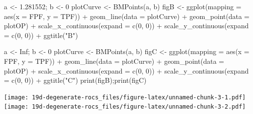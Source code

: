 \documentclass[
]{book}
\newenvironment{Shaded}{\begin{snugshade}}{\end{snugshade}}
\newcommand{\AttributeTok}[1]{\textcolor[rgb]{0.77,0.63,0.00}{#1}}
\newcommand{\ConstantTok}[1]{\textcolor[rgb]{0.00,0.00,0.00}{#1}}
\newcommand{\DecValTok}[1]{\textcolor[rgb]{0.00,0.00,0.81}{#1}}
\newcommand{\FloatTok}[1]{\textcolor[rgb]{0.00,0.00,0.81}{#1}}
\newcommand{\FunctionTok}[1]{\textcolor[rgb]{0.00,0.00,0.00}{#1}}
\newcommand{\NormalTok}[1]{#1}
\newcommand{\OtherTok}[1]{\textcolor[rgb]{0.56,0.35,0.01}{#1}}
\newcommand{\SpecialCharTok}[1]{\textcolor[rgb]{0.00,0.00,0.00}{#1}}
\newcommand{\StringTok}[1]{\textcolor[rgb]{0.31,0.60,0.02}{#1}}
\begin{document}
\begin{Shaded}
\begin{Highlighting}[]
\NormalTok{a }\OtherTok{\textless{}{-}} \FloatTok{1.281552}\NormalTok{; b }\OtherTok{\textless{}{-}} \DecValTok{0}
\NormalTok{plotCurve }\OtherTok{\textless{}{-}} \FunctionTok{BMPoints}\NormalTok{(a, b)}
\NormalTok{figB }\OtherTok{\textless{}{-}} \FunctionTok{ggplot}\NormalTok{(}\AttributeTok{mapping =} \FunctionTok{aes}\NormalTok{(}\AttributeTok{x =}\NormalTok{ FPF, }\AttributeTok{y =}\NormalTok{ TPF)) }\SpecialCharTok{+} 
  \FunctionTok{geom\_line}\NormalTok{(}\AttributeTok{data =}\NormalTok{ plotCurve) }\SpecialCharTok{+} 
  \FunctionTok{geom\_point}\NormalTok{(}\AttributeTok{data =}\NormalTok{ plotOP)  }\SpecialCharTok{+} 
  \FunctionTok{scale\_x\_continuous}\NormalTok{(}\AttributeTok{expand =} \FunctionTok{c}\NormalTok{(}\DecValTok{0}\NormalTok{, }\DecValTok{0}\NormalTok{)) }\SpecialCharTok{+} 
  \FunctionTok{scale\_y\_continuous}\NormalTok{(}\AttributeTok{expand =} \FunctionTok{c}\NormalTok{(}\DecValTok{0}\NormalTok{, }\DecValTok{0}\NormalTok{)) }\SpecialCharTok{+}
  \FunctionTok{ggtitle}\NormalTok{(}\StringTok{"B"}\NormalTok{)}

\NormalTok{a }\OtherTok{\textless{}{-}} \ConstantTok{Inf}\NormalTok{; b }\OtherTok{\textless{}{-}} \DecValTok{0}
\NormalTok{plotCurve }\OtherTok{\textless{}{-}} \FunctionTok{BMPoints}\NormalTok{(a, b)}
\NormalTok{figC }\OtherTok{\textless{}{-}} \FunctionTok{ggplot}\NormalTok{(}\AttributeTok{mapping =} \FunctionTok{aes}\NormalTok{(}\AttributeTok{x =}\NormalTok{ FPF, }\AttributeTok{y =}\NormalTok{ TPF)) }\SpecialCharTok{+} 
  \FunctionTok{geom\_line}\NormalTok{(}\AttributeTok{data =}\NormalTok{ plotCurve) }\SpecialCharTok{+} 
  \FunctionTok{geom\_point}\NormalTok{(}\AttributeTok{data =}\NormalTok{ plotOP)  }\SpecialCharTok{+} 
  \FunctionTok{scale\_x\_continuous}\NormalTok{(}\AttributeTok{expand =} \FunctionTok{c}\NormalTok{(}\DecValTok{0}\NormalTok{, }\DecValTok{0}\NormalTok{)) }\SpecialCharTok{+} 
  \FunctionTok{scale\_y\_continuous}\NormalTok{(}\AttributeTok{expand =} \FunctionTok{c}\NormalTok{(}\DecValTok{0}\NormalTok{, }\DecValTok{0}\NormalTok{)) }\SpecialCharTok{+}
  \FunctionTok{ggtitle}\NormalTok{(}\StringTok{"C"}\NormalTok{)}
\FunctionTok{print}\NormalTok{(figB);}\FunctionTok{print}\NormalTok{(figC)}
\end{Highlighting}
\end{Shaded}

\texttt{[image: 19d-degenerate-rocs\_files/figure-latex/unnamed-chunk-3-1.pdf]} \texttt{[image: 19d-degenerate-rocs\_files/figure-latex/unnamed-chunk-3-2.pdf]}
\end{document}
